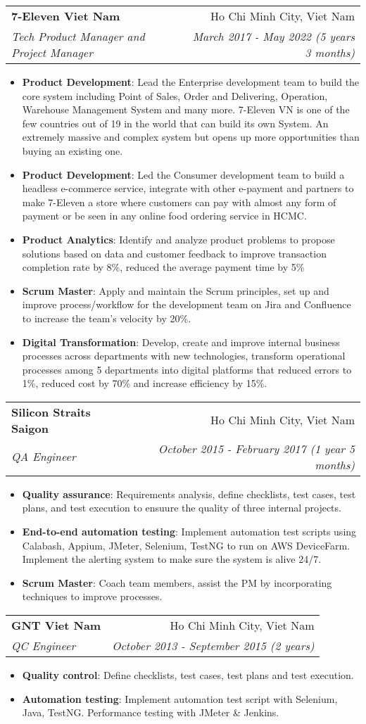 \documentclass[letterpaper,11pt]{article}
\makeatletter
\newcommand{\resumeItem}[2]{
  \item\small{
    \textbf{#1}{: #2 \vspace{-2pt}}
  }
}
\newcommand{\resumeSubheading}[4]{
  \vspace{-1pt}\item
    \begin{tabular*}{0.97\textwidth}[t]{l@{\extracolsep{\fill}}r}
      \textbf{#1} & #2 \\
      \textit{\small#3} & \textit{\small #4} \\
    \end{tabular*}\vspace{-5pt}
}
\newcommand{\resumeItemListStart}{\begin{itemize}}
\newcommand{\resumeItemListEnd}{\end{itemize}\vspace{-5pt}}
\makeatother
\begin{document}
    \resumeSubheading
      {7-Eleven Viet Nam}{Ho Chi Minh City, Viet Nam}
      {Tech Product Manager and Project Manager}{March 2017 - May 2022 (5 years 3 months)}
      \resumeItemListStart
        \resumeItem{Product Development}
        {Lead the Enterprise development team to build the core system including Point of Sales, Order and Delivering, Operation, Warehouse Management System and many more. 7-Eleven VN is one of the few countries out of 19 in the world that can build its own System. An extremely massive and complex system but opens up more opportunities than buying an existing one.}
        \resumeItem{Product Development}
        {Led the Consumer development team to build a headless e-commerce service, integrate with other e-payment and partners to make 7-Eleven a store where customers can pay with almost any form of payment or be seen in any online food ordering service in HCMC.}
        \resumeItem{Product Analytics}
        {Identify and analyze product problems to propose solutions based on data and customer feedback to improve transaction completion rate by 8\%, reduced the average payment time by 5\%}
        \resumeItem{Scrum Master}
        {Apply and maintain the Scrum principles, set up and improve process/workflow for the development team on Jira and Confluence to increase the team's velocity by 20\%.}
        \resumeItem{Digital Transformation}
        {Develop, create and improve internal business processes across departments with new technologies, transform operational processes among 5 departments into digital platforms that reduced errors to 1\%, reduced cost by 70\% and increase efficiency by 15\%.}
    \resumeItemListEnd

    \resumeSubheading
      {Silicon Straits Saigon}{Ho Chi Minh City, Viet Nam}
      {QA Engineer}{October 2015 - February 2017 (1 year 5 months)}
      \resumeItemListStart
        \resumeItem{Quality assurance}
            {Requirements analysis, define checklists, test cases, test plans, and test execution to ensuure the quality of three internal projects.}
        \resumeItem{End-to-end automation testing}
            {Implement automation test scripts using Calabash, Appium, JMeter, Selenium, TestNG to run on AWS DeviceFarm. Implement the alerting system to make sure the system is alive 24/7.}
        \resumeItem{Scrum Master}
            {Coach team members, assist the PM by incorporating techniques to improve processes.}
      \resumeItemListEnd

    \resumeSubheading
      {GNT Viet Nam}{Ho Chi Minh City, Viet Nam}
      {QC Engineer}{October 2013 - September 2015 (2 years)}
      \resumeItemListStart
        \resumeItem{Quality control}
            {Define checklists, test cases, test plans and test execution.}
        \resumeItem{Automation testing}
            {Implement automation test script with Selenium, Java, TestNG. Performance testing with JMeter \& Jenkins.}
      \resumeItemListEnd
\end{document}
